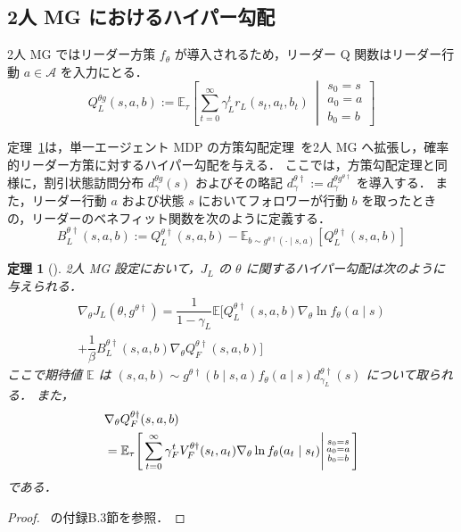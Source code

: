 \documentclass[originalpaper,fleqn]{jsaiart}     %
\providecommand{\E}{\mathbb{E}} %
\newtheorem{theorem}{定理}
\begin{document}
\subsection{2人 MG におけるハイパー勾配}

2人 MG ではリーダー方策 $f_{\theta}$ が導入されるため，リーダー Q 関数はリーダー行動 $a\in\mathcal{A}$ を入力にとる．
\begin{equation*}
    Q_L^{{\theta} {g}}(s, a, b) :=\E_\tau\left[\sum_{t=0}^\infty\gamma_L^t r_L(s_t,a_t,b_t)~\middle|\begin{smallmatrix}s_0=s\\a_0=a\\b_0=b\end{smallmatrix}\right]
\end{equation*}

定理~\ref{thm:hg-mg-stochastic}は，単一エージェント MDP の方策勾配定理~\cite{Sutton1999-su,Sutton2018-jf}を2人 MG へ拡張し，確率的リーダー方策に対するハイパー勾配を与える．
ここでは，方策勾配定理と同様に，割引状態訪問分布 $d_{\gamma}^{\theta g}(s)$ およびその略記 $d_\gamma^{\theta \dag}:=d_\gamma^{\theta g^{\theta\dagger}}$ を導入する．
また，リーダー行動 $a$ および状態 $s$ においてフォロワーが行動 $b$ を取ったときの，リーダーのベネフィット関数を次のように定義する．
\begin{equation*}
    B_L^{{\theta}\dagger}(s, a, b) := Q_L^{{\theta}\dagger}(s,a,b)-\E_{b\sim g^{{\theta}\dagger}(\cdot\mid s,a)}\left[Q_L^{{\theta}\dagger}(s,a,b)\right]
\end{equation*}

\begin{theorem}[]\label{thm:hg-mg-stochastic}
2人 MG 設定において，$J_L$ の $\theta$ に関するハイパー勾配は次のように与えられる．
\begin{multline}
    \nabla_{\theta}J_L({\theta}, g^{\theta\dagger})
    =\dfrac{1}{1-\gamma_L}\E\bigg[Q_L^{{\theta}\dagger}(s,a,b)\nabla_{\theta}\ln f_{\theta}(a\mid s)
   \\+\dfrac{1}{\beta} B_L^{{\theta}\dagger}(s,a,b) \nabla_{\theta}Q_F^{\theta\dagger}(s,a,b)\bigg]\label{eq:hg_MG_stc}
\end{multline}
ここで期待値 $\E$ は $(s,a,b) \sim g^{{\theta}\dagger}(b\mid s,a)f_{\theta}(a\mid s) d_{\gamma_L}^{\theta\dagger}(s)$ について取られる．
また，
\begin{align}
    &\nabla_{\theta}Q_F^{\theta\dagger}(s,a,b) \label{eq:nablaQF_MG_stc}\\ &=\E_{\tau}\Bigg[\sum_{t=0}^\infty \gamma_F^t V_F^{\theta\dag}(s_t,a_t)\nabla_{\theta}\ln f_{\theta}(a_t\mid s_t)\Bigg|\begin{smallmatrix}s_0=s\\a_0=a\\b_0=b\end{smallmatrix}\Bigg]\notag
\end{align}
である．
\end{theorem}
\begin{proof}
~\cite{kudo2026-arxiv}の付録B.3節を参照．
\end{proof}
\end{document}
